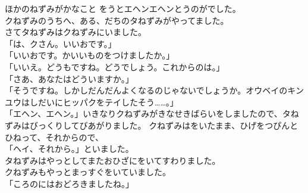 \documentclass[
    a4paper,
    10pt,
    book]
    {tarticle}
\begin{document}
ほかのねずみがかなこと
をうとエヘンエヘンとうのがでした。\\
\indent クねずみのうちへ、ある、だちのタねずみがやってました。\\
\indent さてタねずみはクねずみにいました。\\
「は、クさん。いいおです。」\\
「いいおです。かいいものをつけましたか。」\\
「いいえ。どうもですね。どうでしょう。これからのは。」\\
「さあ、あなたはどういますか。」\\
「そうですね。しかしだんだんよくなるのじゃないでしょうか。オウベイのキンユウはしだいにヒッパクをテイしたそう……。」\\
「エヘン、エヘン。」いきなりクねずみがきなせきばらいをしましたので、タねずみはびっくりしてびあがりました。
クねずみはをいたまま、ひげをつぴんとひねって、それからので、\\
「ヘイ、それから。」といました。\\
\indent タねずみはやっとしてまたおひざにをいてすわりました。\\
\indent クねずみもやっとまっすぐをいていました。\\
「ころのにはおどろきましたね。」

\newpage
\thispagestyle{fancy}
\end{document}
